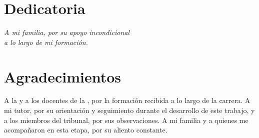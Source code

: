 \chapter*{Dedicatoria}
\vspace*{4cm}
\begin{flushright}
\itshape
A mi familia, por su apoyo incondicional\\
a lo largo de mi formación.
\end{flushright}

\chapter*{Agradecimientos}

A la \universidad{} y a los docentes de la \carrera{}, por la formación recibida a lo largo de la carrera. A mi tutor, por su orientación y seguimiento durante el desarrollo de este trabajo, y a los miembros del tribunal, por sus observaciones. A mi familia y a quienes me acompañaron en esta etapa, por su aliento constante.
